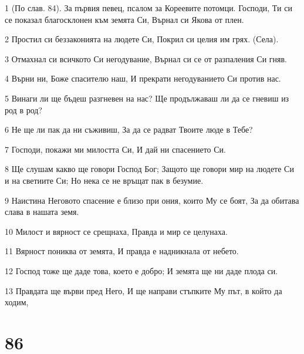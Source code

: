 \par 1 (По слав. 84). За първия певец, псалом за Кореевите потомци. Господи, Ти си се показал благосклонен към земята Си, Върнал си Якова от плен.
\par 2 Простил си беззаконията на людете Си, Покрил си целия им грях. (Села).
\par 3 Отмахнал си всичкото Си негодувание, Върнал си се от разпаления Си гняв.
\par 4 Върни ни, Боже спасителю наш, И прекрати негодуванието Си против нас.
\par 5 Винаги ли ще бъдеш разгневен на нас? Ще продължаваш ли да се гневиш из род в род?
\par 6 Не ще ли пак да ни съживиш, За да се радват Твоите люде в Тебе?
\par 7 Господи, покажи ми милостта Си, И дай ни спасението Си.
\par 8 Ще слушам какво ще говори Господ Бог; Защото ще говори мир на людете Си и на светиите Си; Но нека се не връщат пак в безумие.
\par 9 Наистина Неговото спасение е близо при ония, които Му се боят, За да обитава слава в нашата земя.
\par 10 Милост и вярност се срещнаха, Правда и мир се целунаха.
\par 11 Вярност пониква от земята, И правда е надникнала от небето.
\par 12 Господ тоже ще даде това, което е добро; И земята ще ни даде плода си.
\par 13 Правдата ще върви пред Него, И ще направи стъпките Му път, в който да ходим,

\chapter{86}

